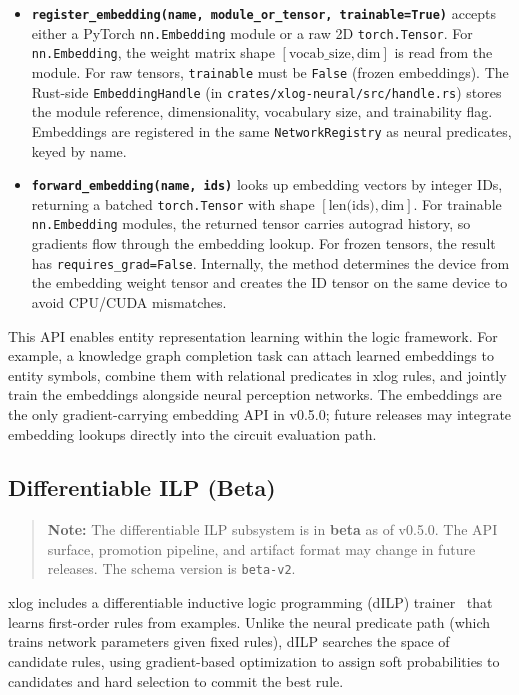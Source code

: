 \begin{itemize}
  \item \textbf{\texttt{register\_embedding(name, module\_or\_tensor, trainable=True)}} accepts either a PyTorch \texttt{nn.Embedding} module or a raw 2D \texttt{torch.Tensor}. For \texttt{nn.Embedding}, the weight matrix shape $[\text{vocab\_size}, \text{dim}]$ is read from the module. For raw tensors, \texttt{trainable} must be \texttt{False} (frozen embeddings). The Rust-side \texttt{EmbeddingHandle} (in \texttt{crates/xlog-neural/src/handle.rs}) stores the module reference, dimensionality, vocabulary size, and trainability flag. Embeddings are registered in the same \texttt{NetworkRegistry} as neural predicates, keyed by name.
  \item \textbf{\texttt{forward\_embedding(name, ids)}} looks up embedding vectors by integer IDs, returning a batched \texttt{torch.Tensor} with shape $[\text{len(ids)}, \text{dim}]$. For trainable \texttt{nn.Embedding} modules, the returned tensor carries autograd history, so gradients flow through the embedding lookup. For frozen tensors, the result has \texttt{requires\_grad=False}. Internally, the method determines the device from the embedding weight tensor and creates the ID tensor on the same device to avoid CPU/CUDA mismatches.
\end{itemize}

This API enables entity representation learning within the logic framework. For example, a knowledge graph completion task can attach learned embeddings to entity symbols, combine them with relational predicates in xlog rules, and jointly train the embeddings alongside neural perception networks. The embeddings are the only gradient-carrying embedding API in v0.5.0; future releases may integrate embedding lookups directly into the circuit evaluation path.

\subsection{Differentiable ILP (Beta)}

\begin{quote}\small
\textbf{Note:} The differentiable ILP subsystem is in \textbf{beta} as of v0.5.0. The API surface, promotion pipeline, and artifact format may change in future releases. The schema version is \texttt{beta-v2}.
\end{quote}

xlog includes a differentiable inductive logic programming (dILP) trainer~\cite{dilp} that learns first-order rules from examples. Unlike the neural predicate path (which trains network parameters given fixed rules), dILP searches the space of candidate rules, using gradient-based optimization to assign soft probabilities to candidates and hard selection to commit the best rule.

